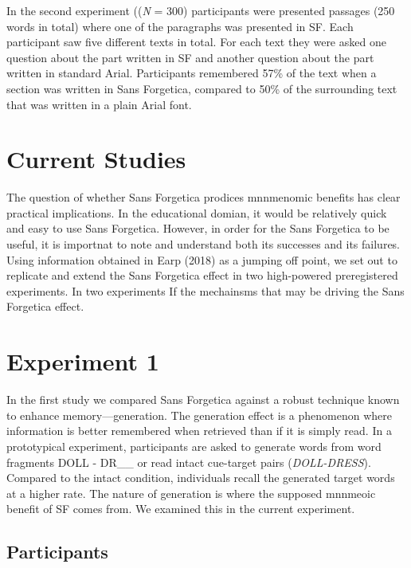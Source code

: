 \documentclass[pdf]{apa6}
\begin{document}
In the second experiment ((\emph{N} = 300) participants were presented passages (250 words in total) where one of the paragraphs was presented in SF. Each participant saw five different texts in total. For each text they were asked one question about the part written in SF and another question about the part written in standard Arial. Participants remembered 57\% of the text when a section was written in Sans Forgetica, compared to 50\% of the surrounding text that was written in a plain Arial font.

\hypertarget{current-studies}{%
\section{Current Studies}\label{current-studies}}

The question of whether Sans Forgetica prodices mnnmenomic benefits has clear practical implications. In the educational domian, it would be relatively quick and easy to use Sans Forgetica. However, in order for the Sans Forgetica to be useful, it is importnat to note and understand both its successes and its failures. Using information obtained in Earp (2018) as a jumping off point, we set out to replicate and extend the Sans Forgetica effect in two high-powered preregistered experiments. In two experiments If the mechainsms that may be driving the Sans Forgetica effect.

\hypertarget{experiment-1}{%
\section{Experiment 1}\label{experiment-1}}

In the first study we compared Sans Forgetica against a robust technique known to enhance memory---generation. The generation effect is a phenomenon where information is better remembered when retrieved than if it is simply read. In a prototypical experiment, participants are asked to generate words from word fragments DOLL - DR\_\_ or read intact cue-target pairs (\emph{DOLL-DRESS}). Compared to the intact condition, individuals recall the generated target words at a higher rate. The nature of generation is where the supposed mnnmeoic benefit of SF comes from. We examined this in the current experiment.

\hypertarget{participants}{%
\subsection{Participants}\label{participants}}
\end{document}
